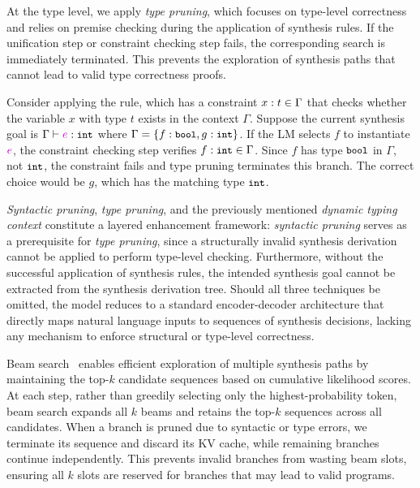 \documentclass[manuscript,screen]{acmart}
\newcommand{\stlctype}[3]{{#1} \vdash {#2} : {#3}}
\newcommand{\sk}[1]{\textcolor{skunknown}{#1}}
\newcommand{\tcode}[1]{{\small \texttt{\spaceskip=0.2em #1}}}
\providecommand{\DIFadd}[1]{{\protect\color{blue}\uwave{#1}}} %
\providecommand{\DIFaddbegin}{} %
\providecommand{\DIFaddend}{} %
\providecommand{\DIFaddincludegraphics}[2][]{{\color{blue}\fbox{\DIFOincludegraphics[#1]{#2}}}} %
\DeclareRobustCommand{\DIFaddbegin}{\DIFOaddbegin \let\includegraphics\DIFaddincludegraphics} %
\DeclareRobustCommand{\DIFaddend}{\DIFOaddend \let\includegraphics\DIFOincludegraphics} %
\begin{document}
At the type level, we apply \emph{type pruning}, which focuses on type-level correctness and relies on premise checking during the application of synthesis rules. 
If the unification step or constraint checking step fails, the corresponding search is immediately terminated. 
This prevents the exploration of synthesis paths that cannot lead to valid type correctness proofs.
%
\begin{example}
Consider applying the  rule, which has a constraint ${x}:{t} \in {\Gamma}$ that checks whether the variable $x$ with type $t$ exists in the context $\Gamma$. Suppose the current synthesis goal is $\stlctype{\Gamma}{\sk{e}}{\tcode{int}}$ where $\Gamma = \{f : \tcode{bool}, g : \tcode{int}\}$. If the LM selects $f$ to instantiate $\sk{e}$, the constraint checking step verifies $\checkBinding{\Gamma}{f}{\tcode{int}}$. Since $f$ has type $\tcode{bool}$ in $\Gamma$, not $\tcode{int}$, the constraint fails and type pruning terminates this branch. The correct choice would be $g$, which has the matching type $\tcode{int}$.
\end{example}

\emph{Syntactic pruning}, \emph{type pruning}, and the previously mentioned \emph{dynamic typing context} constitute a layered enhancement framework: 
\emph{syntactic pruning} serves as a prerequisite for \emph{type pruning}, since a structurally invalid synthesis derivation cannot be applied to perform type-level checking. 
Furthermore, without the successful application of synthesis rules, the intended synthesis goal cannot be extracted from the synthesis derivation tree. 
Should all three techniques be omitted, the model reduces to a standard encoder-decoder architecture that directly maps natural language inputs to sequences of synthesis decisions, lacking any mechanism to enforce structural or type-level correctness.

Beam search~\cite{DBLP:conf/aclnmt/FreitagA17} enables efficient exploration of multiple synthesis paths by maintaining the top-$k$ candidate sequences based on cumulative likelihood scores. At each step, rather than greedily selecting only the highest-probability token, beam search expands all $k$ beams and retains the top-$k$ sequences across all candidates.
When a branch is pruned due to syntactic or type errors, we terminate its sequence and discard its KV cache, while \DIFaddbegin \DIFadd{the }\DIFaddend remaining branches continue independently. This prevents invalid branches from wasting beam slots, ensuring all $k$ slots are reserved for branches that may lead to valid programs.
\end{document}
